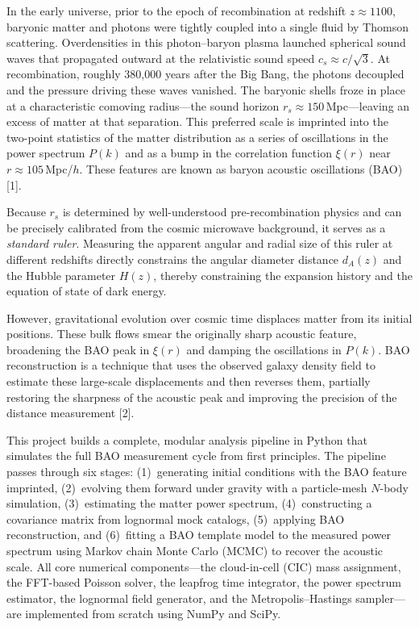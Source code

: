 \documentclass[10pt]{article}
\begin{document}
In the early universe, prior to the epoch of recombination at redshift $z \approx 1100$, baryonic matter and photons were tightly coupled into a single fluid by Thomson scattering.  Overdensities in this photon--baryon plasma launched spherical sound waves that propagated outward at the relativistic sound speed $c_s \approx c/\sqrt{3}$.  At recombination, roughly 380{,}000 years after the Big Bang, the photons decoupled and the pressure driving these waves vanished.  The baryonic shells froze in place at a characteristic comoving radius---the sound horizon $r_s \approx 150$\,Mpc---leaving an excess of matter at that separation.  This preferred scale is imprinted into the two-point statistics of the matter distribution as a series of oscillations in the power spectrum $P(k)$ and as a bump in the correlation function $\xi(r)$ near $r \approx 105$\,Mpc/$h$.  These features are known as baryon acoustic oscillations (BAO) [1].

Because $r_s$ is determined by well-understood pre-recombination physics and can be precisely calibrated from the cosmic microwave background, it serves as a \emph{standard ruler}.  Measuring the apparent angular and radial size of this ruler at different redshifts directly constrains the angular diameter distance $d_A(z)$ and the Hubble parameter $H(z)$, thereby constraining the expansion history and the equation of state of dark energy.

However, gravitational evolution over cosmic time displaces matter from its initial positions.  These bulk flows smear the originally sharp acoustic feature, broadening the BAO peak in $\xi(r)$ and damping the oscillations in $P(k)$.  BAO reconstruction is a technique that uses the observed galaxy density field to estimate these large-scale displacements and then reverses them, partially restoring the sharpness of the acoustic peak and improving the precision of the distance measurement [2].

This project builds a complete, modular analysis pipeline in Python that simulates the full BAO measurement cycle from first principles.  The pipeline passes through six stages: (1)~generating initial conditions with the BAO feature imprinted, (2)~evolving them forward under gravity with a particle-mesh $N$-body simulation, (3)~estimating the matter power spectrum, (4)~constructing a covariance matrix from lognormal mock catalogs, (5)~applying BAO reconstruction, and (6)~fitting a BAO template model to the measured power spectrum using Markov chain Monte Carlo (MCMC) to recover the acoustic scale.  All core numerical components---the cloud-in-cell (CIC) mass assignment, the FFT-based Poisson solver, the leapfrog time integrator, the power spectrum estimator, the lognormal field generator, and the Metropolis--Hastings sampler---are implemented from scratch using NumPy and SciPy.
\end{document}

